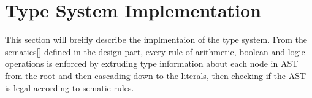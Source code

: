 \section{Type System Implementation}\label{TypSysImp}

This section will breifly describe the implmentaion of the type system. From the sematics\cref{} defined in the design part, every rule of arithmetic, boolean and logic operations is enforced by extruding type information about each node in AST from the root and then cascading down to the literals, then checking if the AST is legal according to sematic rules.



